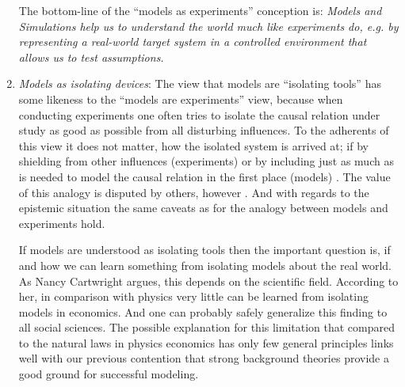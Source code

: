 \documentclass[onecollarge]{STJour}
\numberwithin{equation}{section}
\begin{document}
\begin{enumerate}
  The bottom-line of the ``models as experiments'' conception is: {\em
  Models and Simulations help us to understand the world much like
  experiments do, e.g. by representing a real-world target system in a
  controlled environment that allows us to test assumptions.}
   
  \item {\em Models as isolating devices}: The view that models are
  ``isolating tools'' has some likeness to the ``models are
  experiments'' view, because when conducting experiments one often
  tries to isolate the causal relation under study as good as possible
  from all disturbing influences. To the adherents of this view it does
  not matter, how the isolated system is arrived at; if by shielding
  from other influences (experiments) or by including just as much as is
  needed to model the causal relation in the first place (models)
  \citep[]{maeki:2009}. The value of this analogy is disputed by others,
  however \citep[p.\ 127]{kourikoski-lethinen:2009}. And with regards to
  the epistemic situation the same caveats as for the analogy between
  models and experiments hold.
  
  If models are understood as isolating tools then the important
  question is, if and how we can learn something from isolating models
  about the real world. As Nancy Cartwright argues, this depends on the
  scientific field. According to her, in comparison with physics very
  little can be learned from isolating models in economics. And one can
  probably safely generalize this finding to all social sciences. The
  possible explanation for this limitation that compared to the natural
  laws in physics economics has only few general principles
  \citep[]{cartwright:2009} links well with our previous contention that
  strong background theories provide a good ground for successful
  modeling.
  

\end{enumerate}
\end{document}
